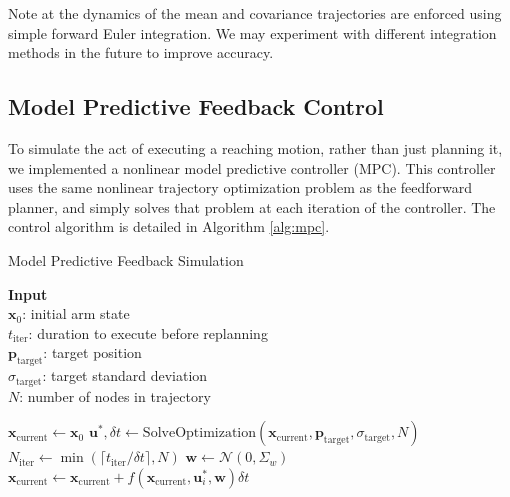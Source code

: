 \documentclass[letterpaper, 10pt, conference]{ieeeconf}
\begin{document}
Note at the dynamics of the mean and covariance trajectories are enforced using simple forward Euler integration. We may experiment with different integration methods in the future to improve accuracy.

\subsection{Model Predictive Feedback Control}
To simulate the act of executing a reaching motion, rather than just planning it, we implemented a nonlinear model predictive controller (MPC). This controller uses the same nonlinear trajectory optimization problem as the feedforward planner, and simply solves that problem at each iteration of the controller. The control algorithm is detailed in Algorithm \ref{alg:mpc}.

\begin{algorithm}
\caption{Model Predictive Feedback Simulation}\label{alg:mpc}
 \hspace*{\algorithmicindent} \textbf{Input} \\
    \hspace*{\algorithmicindent} \quad $\mathbf{x}_0$: initial arm state \\
    \hspace*{\algorithmicindent} \quad $t_{\text{iter}}$: duration to execute before replanning \\
    \hspace*{\algorithmicindent} \quad $\mathbf{p}_{\text{target}}$: target position \\
    \hspace*{\algorithmicindent} \quad $\sigma_{\text{target}}$: target standard deviation \\
    \hspace*{\algorithmicindent} \quad $N$: number of nodes in trajectory 
\begin{algorithmic}
\State $\mathbf{x}_{\text{current}} \gets \mathbf{x}_0$
    \State $\mathbf{u}^*, \delta t \gets \text{SolveOptimization}(\mathbf{x}_{\text{current}}, \mathbf{p}_{\text{target}}, \sigma_{\text{target}}, N)$
    \State $N_{\text{iter}} \gets \min(\lceil t_{\text{iter}} / \delta t \rceil, N)$
        \State $\mathbf{w} \gets \mathcal{N}(0, \Sigma_w)$
        \State $\mathbf{x}_{\text{current}} \gets \mathbf{x}_{\text{current}} + f(\mathbf{x}_{\text{current}}, \mathbf{u}_i^*, \mathbf{w}) \delta t$
    \EndFor
\EndWhile
\end{algorithmic}
\end{algorithm}
\end{document}
